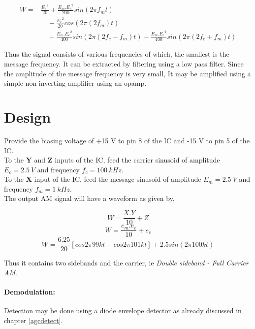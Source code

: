 \begin{equation}
\begin{split}
W=& \frac{{E_c}^2}{20}+\frac{E_m.{E_c}^2}{200}sin(2\pi f_mt) \\
&\quad -\frac{{E_c}^2}{20}cos(2\pi(2f_m)t) \\
&\quad +\frac{E_m.{E_c}^2}{400}sin(2\pi (2f_c-f_m)t)  -  \frac{E_m.{E_c}^2}{400}sin(2\pi (2f_c+f_m)t)
\end{split}
\end{equation}

Thus the signal consists of various frequencies of which, the smallest is the message frequency. It can be extracted by filtering using a low pass filter. Since the amplitude of the message frequency is very small, It may be amplified using a simple non-inverting amplifier using an opamp.

\section*{Design}
Provide the biasing voltage of +15 V to pin 8 of the IC and -15 V to pin 5 of the IC.\\

\noindent To the \textbf{Y} and \textbf{Z} inputs of the IC, feed the carrier sinusoid of amplitude $E_c=2.5\ V$ and frequency $f_c= 100\ kHz$.\\
To the \textbf{X} input of the IC, feed the message sinusoid of amplitude $E_m=2.5\ V$ and frequency $f_m= 1\ kHz$.\\

\noindent The output AM signal will have a waveform as given by,

\begin{equation}
W=\frac{X.Y}{10}+Z
\end{equation}
\begin{equation}
W=\frac{e_m.e_c}{10}+e_c
\end{equation}
\begin{equation}
W=\frac{6.25}{20}[cos 2\pi 99kt-cos 2\pi 101kt]+2.5 sin(2\pi100kt)
\end{equation}

\noindent Thus it contains two sidebands and the carrier, ie \emph{Double sideband - Full Carrier AM}.
\paragraph{Demodulation:}
Detection may be done using a diode envelope detector as already discussed in chapter \ref{agcdetect}.

